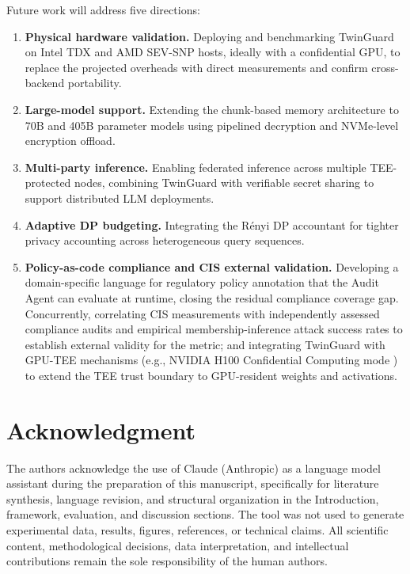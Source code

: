 \documentclass{ieeeaccess}
\begin{document}
Future work will address five directions:

\begin{enumerate}
\item \textbf{Physical hardware validation.} Deploying and benchmarking
TwinGuard on Intel TDX and AMD SEV-SNP hosts, ideally with a confidential
GPU, to replace the projected overheads with direct measurements and confirm
cross-backend portability.

\item \textbf{Large-model support.} Extending the chunk-based memory
architecture to 70B and 405B parameter models using pipelined decryption
and NVMe-level encryption offload.

\item \textbf{Multi-party inference.} Enabling federated inference across
multiple TEE-protected nodes, combining TwinGuard with verifiable secret
sharing to support distributed LLM deployments.

\item \textbf{Adaptive DP budgeting.} Integrating the R\'enyi DP accountant
\cite{mironov2017renyi} for tighter privacy accounting across heterogeneous
query sequences.

\item \textbf{Policy-as-code compliance and CIS external validation.}
Developing a domain-specific language for regulatory policy annotation that
the Audit Agent can evaluate at runtime, closing the residual compliance
coverage gap. Concurrently, correlating CIS measurements with independently
assessed compliance audits and empirical membership-inference attack success
rates to establish external validity for the metric; and integrating TwinGuard
with GPU-TEE mechanisms (e.g., NVIDIA H100 Confidential Computing mode
\cite{nvidia2023cc}) to extend the TEE trust boundary to GPU-resident
weights and activations.
\end{enumerate}

\section*{Acknowledgment}

The authors acknowledge the use of Claude (Anthropic) as a language model
assistant during the preparation of this manuscript, specifically for
literature synthesis, language revision, and structural organization in the
Introduction, framework, evaluation, and discussion sections. The tool was
not used to generate experimental data, results, figures, references, or
technical claims. All scientific content, methodological decisions, data
interpretation, and intellectual contributions remain the sole responsibility
of the human authors.
\end{document}
